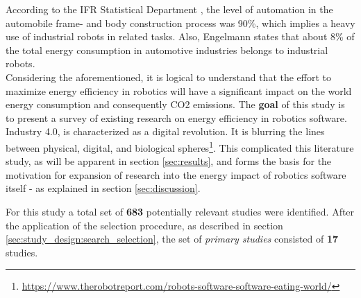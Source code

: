 According to the IFR Statistical Department \cite{IFR2010executive_summary}, 
the level of automation in the automobile frame- and body construction process was 90\%, which implies a heavy use of industrial robots in related tasks. 
Also, Engelmann \cite{engelmann2009energy_efficient_factories} states that about 8\% of the total energy consumption in automotive industries belongs to industrial robots. \\

Considering the aforementioned, it is logical to understand that the effort to maximize energy efficiency in robotics will have a 
significant impact on the world energy consumption and consequently CO2 emissions.
The \textbf{goal} of this study is to present a survey of existing research on energy efficiency in robotics software.
Industry 4.0, is characterized as a digital revolution.
It is blurring the lines between physical, digital, and biological spheres\footnote{\url{https://www.therobotreport.com/robots-software-software-eating-world/}}.
This complicated this literature study, as will be apparent in section \ref{sec:results}, 
and forms the basis for the motivation for expansion of research into the energy impact of robotics software itself 
- as explained in section \ref{sec:discussion}.

For this study a total set of \textbf{683} potentially relevant studies were identified. 
After the application of the selection procedure, as described in section \ref{sec:study_design:search_selection}, 
the set of \textit{primary studies} consisted of \textbf{17} studies.